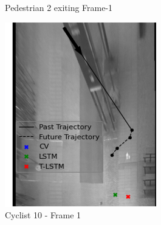 \documentclass{article}
\begin{document}
\begin{figure}[H]
\begin{subfigure}{0.4\textwidth}
  \caption{Pedestrian 2 exiting Frame-1}
  \label{fig:ped-exit}
\end{subfigure}
\begin{subfigure}{0.40\textwidth}
  \centering
  \includegraphics[width=\linewidth]{quali_results/cyc-10.png}
  \caption{Cyclist 10 - Frame 1}
  \label{fig:cyc10}
\end{subfigure}
\begin{subfigure}{0.40\textwidth}
  \centering

\end{subfigure}
\end{figure}
\end{document}
